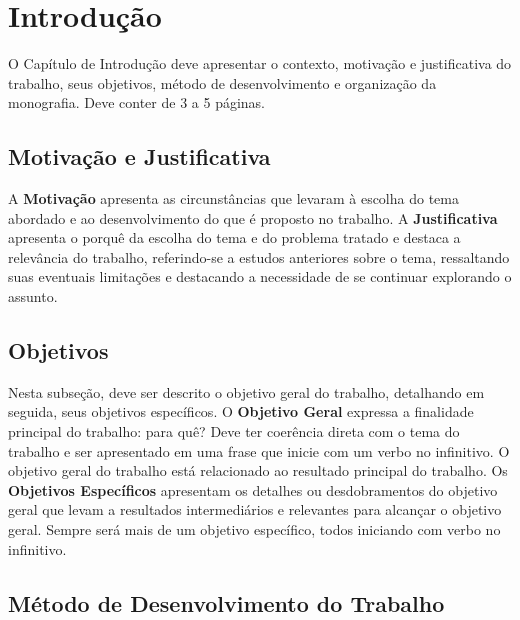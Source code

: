 \chapter{Introdução}
\label{sec-intro}

O Capítulo de Introdução deve apresentar o contexto, motivação e justificativa do trabalho, seus objetivos, método de desenvolvimento e organização da monografia. Deve conter de 3 a 5 páginas.


\section{Motivação e Justificativa}
\label{sec-intro-motjus}

A \textbf{Motivação} apresenta as circunstâncias que levaram à escolha do tema abordado e ao desenvolvimento do que é proposto no trabalho. A \textbf{Justificativa} apresenta o porquê da escolha do tema e do problema tratado e destaca a relevância do trabalho, referindo-se a estudos anteriores sobre o tema, ressaltando suas eventuais limitações e destacando a necessidade de se continuar explorando o assunto.


\section{Objetivos}
\label{sec-intro-obj}

Nesta subseção, deve ser descrito o objetivo geral do trabalho, detalhando em seguida, seus objetivos específicos. O \textbf{Objetivo Geral} expressa a finalidade principal do trabalho: para quê? Deve ter coerência direta com o tema do trabalho e ser apresentado em uma frase que inicie com um verbo no infinitivo. O objetivo geral do trabalho está relacionado ao resultado principal do trabalho. Os \textbf{Objetivos Específicos} apresentam os detalhes ou desdobramentos do objetivo geral que levam a resultados intermediários e relevantes para alcançar o objetivo geral. Sempre será mais de um objetivo específico, todos iniciando com verbo no infinitivo.


\section{Método de Desenvolvimento do Trabalho}
\label{sec-intro-met}

